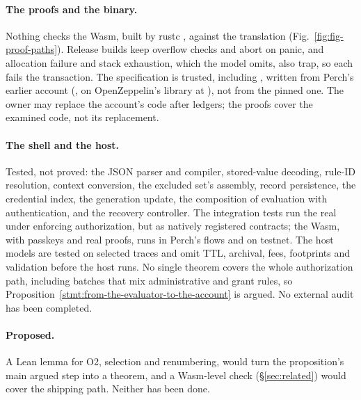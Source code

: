 \paragraph{The proofs and the binary.} Nothing checks the Wasm, built by rustc
, against the translation (Fig.~\ref{fig:fig-proof-paths}).
Release builds keep overflow checks and abort on
panic, and allocation failure and stack exhaustion, which the model omits, also
trap, so each fails the transaction. The specification is trusted, including
, written from Perch's earlier account (,
on OpenZeppelin's library at ), not from the pinned one. The
owner may replace the account's code after  ledgers;
the proofs cover the examined code, not its replacement.

\paragraph{The shell and the host.} Tested, not proved: the JSON parser and
compiler, stored-value decoding, rule-ID resolution, context conversion, the
excluded set's assembly, record persistence, the credential index, the
generation update, the composition of evaluation with authentication, and the
recovery controller. The integration tests run the real 
under enforcing authorization, but as natively registered contracts; the Wasm,
with passkeys and real proofs, runs in Perch's  flows
and on testnet. The host models are tested on selected traces and omit TTL,
archival, fees, footprints and validation before the host runs. No single
theorem covers the whole authorization path, including batches that mix
administrative and grant rules, so
Proposition~\ref{stmt:from-the-evaluator-to-the-account} is argued. No external
audit has been completed.

\paragraph{Proposed.} A Lean lemma for O2, selection and renumbering, would turn
the proposition's main argued step into a theorem, and a Wasm-level check
(\S\ref{sec:related}) would cover the shipping path. Neither has been done.
